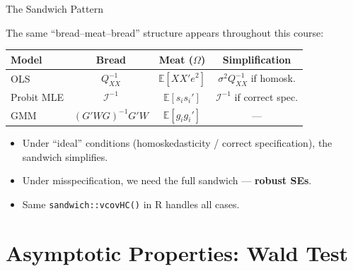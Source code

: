 \documentclass[aspectratio=169, handout, t]{beamer}
\numberwithin{equation}{section}
\begin{document}
\begin{frame}{The Sandwich Pattern}

The same ``bread--meat--bread'' structure appears throughout this course:

\medskip

\renewcommand{\arraystretch}{1.5}
\begin{tabular}{lccc}
\toprule
\textbf{Model} & \textbf{Bread} & \textbf{Meat} ($\Omega$) & \textbf{Simplification} \\
\midrule
OLS & $Q_{XX}^{-1}$ & $\mathbb{E}[XX'e^2]$ & $\sigma^2 Q_{XX}^{-1}$ if homosk. \\
Probit MLE & $\mathcal{I}^{-1}$ & $\mathbb{E}[s_i s_i']$ & $\mathcal{I}^{-1}$ if correct spec. \\
GMM & $(G'WG)^{-1}G'W$ & $\mathbb{E}[g_i g_i']$ & --- \\
\bottomrule
\end{tabular}
\renewcommand{\arraystretch}{1.0}

\pause

\bigskip

\begin{itemize}
    \item Under ``ideal'' conditions (homoskedasticity / correct specification), the sandwich simplifies.
    \item Under misspecification, we need the full sandwich --- \textbf{robust SEs}.
    \item Same \texttt{sandwich::vcovHC()} in R handles all cases.
\end{itemize}

\end{frame}


\section{Asymptotic Properties: Wald Test}
\setcounter{subsection}{1}
\end{document}
